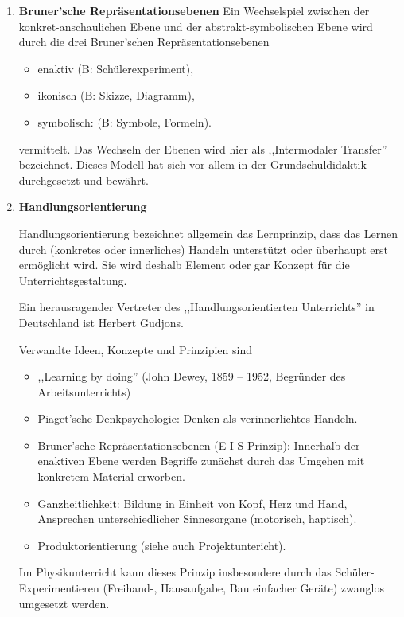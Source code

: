 \begin{enumerate}
\begin{itemize}
	\end{itemize}

	\item{\textbf{Bruner'sche Repr\"{a}sentationsebenen}}
		Ein Wechselspiel zwischen der konkret-anschaulichen Ebene
		und der abstrakt-symbolischen Ebene
		wird durch die drei Bruner'schen Repr\"{a}sentationsebenen
		\begin{itemize}
			\item
			enaktiv (B: Sch\"{u}lerexperiment),
			\item
			ikonisch (B: Skizze, Diagramm),
			\item
			symbolisch: (B: Symbole, Formeln).
		\end{itemize}
		vermittelt. Das Wechseln der Ebenen wird hier als
		,,Intermodaler Transfer'' bezeichnet.
		Dieses Modell hat sich vor allem in der Grundschuldidaktik
		durchgesetzt und bew\"{a}hrt.
	
	\item{\textbf{Handlungsorientierung}}
	
	Handlungsorientierung bezeichnet allgemein das Lernprinzip, dass
	das Lernen durch (konkretes oder innerliches)
	Handeln unterst\"{u}tzt oder
	\"{u}berhaupt erst erm\"{o}glicht wird.
	Sie wird deshalb Element oder gar Konzept f\"{u}r die
	Unterrichtsgestaltung.
	
	Ein herausragender Vertreter des
	,,Handlungsorientierten Unterrichts'' in
	Deutschland ist Herbert Gudjons.
		
	Verwandte Ideen, Konzepte und Prinzipien sind
	\begin{itemize}
		\item
		,,Learning by doing'' (John Dewey, 1859 -- 1952,
		                       Begr\"{u}nder des Arbeitsunterrichts)
		\item
		Piaget'sche Denkpsychologie: Denken als verinnerlichtes Handeln.
		\item
		Bruner'sche Repr\"{a}sentationsebenen (E-I-S-Prinzip):
		Innerhalb der enaktiven  Ebene werden Begriffe zun\"{a}chst durch das
		Umgehen mit konkretem Material erworben.
		\item
		Ganzheitlichkeit: Bildung in Einheit von Kopf, Herz und Hand,
		Ansprechen
		unterschiedlicher Sinnesorgane (motorisch, haptisch).
		\item
		Produktorientierung (siehe auch Projektuntericht).
	\end{itemize}
	
	Im Physikunterricht kann dieses Prinzip insbesondere durch
	das Sch\"{u}ler-Experimentieren (Freihand-, Hausaufgabe,
	Bau einfacher Ger\"{a}te) zwanglos umgesetzt werden.
	

\end{enumerate}

